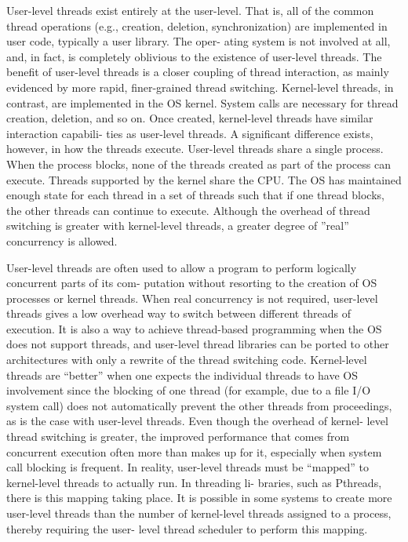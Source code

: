 \documentclass[8pt,landscape]{article}
\begin{document}
\begin{multicols}{3}
\begin{tiny}
User-level threads exist entirely at the user-level.  That is, all of the common thread operations
(e.g., creation, deletion, synchronization) are implemented in user code, typically a user library.  The oper-
ating system is not involved at all, and, in fact, is completely oblivious to the existence of user-level threads.
The benefit of user-level threads is a closer coupling of thread interaction, as mainly evidenced by more
rapid, finer-grained thread switching.
Kernel-level threads,  in contrast,  are implemented in the OS kernel.   System calls are necessary for
thread creation, deletion, and so on.  Once created, kernel-level threads have similar interaction capabili-
ties as user-level threads.  A significant difference exists, however, in how the threads execute.  User-level
threads share a single process.  When the process blocks, none of the threads created as part of the process
can execute. Threads supported by the kernel share the CPU. The OS has maintained enough state for each
thread in a set of threads such that if one thread blocks, the other threads can continue to execute. Although
the overhead of thread switching is greater with kernel-level threads, a greater degree of ”real” concurrency
is allowed.

User-level threads are often used to allow a program to perform logically concurrent parts of its com-
putation without resorting to the creation of OS processes or kernel threads.  When real concurrency is not
required, user-level threads gives a low overhead way to switch between different threads of execution.  It
is also a way to achieve thread-based programming when the OS does not support threads, and user-level
thread libraries can be ported to other architectures with only a rewrite of the thread switching code.
Kernel-level threads are “better” when one expects the individual threads to have OS involvement since
the blocking of one thread (for example, due to a file I/O system call) does not automatically prevent the
other threads from proceedings, as is the case with user-level threads. Even though the overhead of kernel-
level thread switching is greater,  the improved performance that comes from concurrent execution often
more than makes up for it, especially when system call blocking is frequent.
In reality, user-level threads must be “mapped” to kernel-level threads to actually run.  In threading li-
braries, such as Pthreads, there is this mapping taking place.  It is possible in some systems to create more
user-level threads than the number of kernel-level threads assigned to a process, thereby requiring the user-
level thread scheduler to perform this mapping.


\end{tiny}
\end{multicols}
\end{document}
